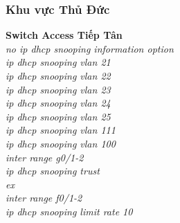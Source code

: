 \documentclass[12pt,a4paper]{report}
\begin{document}
\subsubsection{Khu vực Thủ Đức}
\hspace*{1cm}\textbf{Switch Access Tiếp Tân}\\
\hspace*{2cm}\textit{no ip dhcp snooping information option\\
\hspace*{2cm}ip dhcp snooping vlan 21\\
\hspace*{2cm}ip dhcp snooping vlan 22\\
\hspace*{2cm}ip dhcp snooping vlan 23\\
\hspace*{2cm}ip dhcp snooping vlan 24\\
\hspace*{2cm}ip dhcp snooping vlan 25\\
\hspace*{2cm}ip dhcp snooping vlan 111\\
\hspace*{2cm}ip dhcp snooping vlan 100\\
\hspace*{2cm}inter range g0/1-2\\
\hspace*{2cm}ip dhcp snooping trust\\
\hspace*{2cm}ex\\
\hspace*{2cm}inter range f0/1-2\\
\hspace*{2cm}ip dhcp snooping limit rate 10\\}
\end{document}
